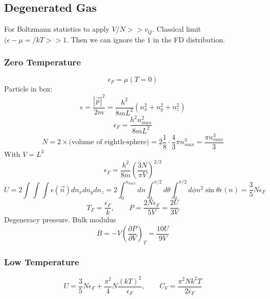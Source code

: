 \documentclass[a4paper,norsk, 10pt]{article}
\newcommand{\pd}[3]{\left(\frac{\partial #1}{\partial #2}\right)_{#3}}
\begin{document}
\subsection{Degenerated Gas}
For Boltzmann statistics to apply $V/N>> v_Q$. Classical limit $(\epsilon - \mu=/kT >> 1$. Then we can ignore the $1$ in the FD distribution.	
\subsubsection{Zero Temperature}
\begin{equation}
\epsilon_F = \mu(T = 0)
\end{equation}
Particle in box:
\begin{equation}
\epsilon = \frac{|\vec{p}|^2}{2m} = \frac{h^2}{8mL^2}(n^2_x + n^2_y + n^2_z)
\end{equation}
\begin{equation}
\epsilon_F = \frac{h^2n_{max}^2}{8mL^2}
\end{equation}
\begin{equation}
N = 2\times \text{(volume of eighth-sphere)} = 2\frac{1}{8}\cdot\frac{4}{3}\pi n_{max}^3 = \frac{\pi n_{max}^3}{3}
\end{equation}
With $V=L^3$
\begin{equation}
\epsilon_F = \frac{h^2}{8m}\left(\frac{3N}{\pi V}\right)^{2/3}
\end{equation}
\begin{equation}
U = 2\int \int \int \epsilon(\vec{n})dn_x dn_y dn_z = 2\int_0^{n_{max}}dn\int_0^{\pi/2}d\theta\int_0^{\pi/2}d\phi n^2\sin\theta \epsilon(n) = \frac{3}{5}N\epsilon_F
\end{equation}
\begin{equation}
T_F = \frac{\epsilon_F}{k}, \qquad P = \frac{2N\epsilon_F}{5V} = \frac{2U}{3V}
\end{equation}
Degeneracy pressure. Bulk modulus
\begin{equation}
B = -V\pd{P}{V}{T} = \frac{10U}{9V}
\end{equation}
\subsubsection{Low Temperature}
\begin{equation}
U = \frac{3}{5}N\epsilon_F + \frac{\pi^2}{4}N\frac{(kT)^2}{\epsilon_F}, \qquad C_V = \frac{\pi^2 Nk^2T}{2\epsilon_F}
\end{equation}
\end{document}

